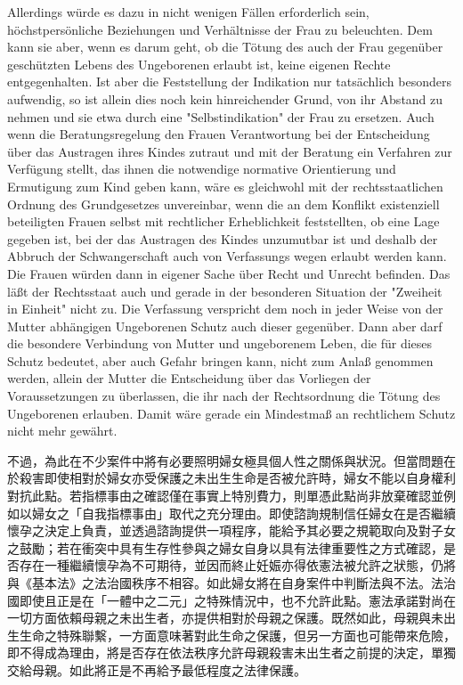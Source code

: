 \documentclass[12pt]{article}
\begin{document}
\begin{sourcepara}[title={原文D.95}]
Allerdings würde es dazu in nicht wenigen Fällen erforderlich sein, höchstpersönliche Beziehungen und Verhältnisse der Frau zu beleuchten. Dem kann sie aber, wenn es darum geht, ob die Tötung des auch der Frau gegenüber geschützten Lebens des Ungeborenen erlaubt ist, keine eigenen Rechte entgegenhalten. Ist aber die Feststellung der Indikation nur tatsächlich besonders aufwendig, so ist allein dies noch kein hinreichender Grund, von ihr Abstand zu nehmen und sie etwa durch eine "Selbstindikation" der Frau zu ersetzen. Auch wenn die Beratungsregelung den Frauen Verantwortung bei der Entscheidung über das Austragen ihres Kindes zutraut und mit der Beratung ein Verfahren zur Verfügung stellt, das ihnen die notwendige normative Orientierung und Ermutigung zum Kind geben kann, wäre es gleichwohl mit der rechtsstaatlichen Ordnung des Grundgesetzes unvereinbar, wenn die an dem Konflikt existenziell beteiligten Frauen selbst mit rechtlicher Erheblichkeit feststellten, ob eine Lage gegeben ist, bei der das Austragen des Kindes unzumutbar ist und deshalb der Abbruch der Schwangerschaft auch von Verfassungs wegen erlaubt werden kann. Die Frauen würden dann in eigener Sache über Recht und Unrecht befinden. Das läßt der Rechtsstaat auch und gerade in der besonderen Situation der "Zweiheit in Einheit" nicht zu. Die Verfassung verspricht dem noch in jeder Weise von der Mutter abhängigen Ungeborenen Schutz auch dieser gegenüber. Dann aber darf die besondere Verbindung von Mutter und ungeborenem Leben, die für dieses Schutz bedeutet, aber auch Gefahr bringen kann, nicht zum Anlaß genommen werden, allein der Mutter die Entscheidung über das Vorliegen der Voraussetzungen zu überlassen, die ihr nach der Rechtsordnung die Tötung des Ungeborenen erlauben. Damit wäre gerade ein Mindestmaß an rechtlichem Schutz nicht mehr gewährt.
\end{sourcepara}
\begin{transpara}
不過，為此在不少案件中將有必要照明婦女極具個人性之關係與狀況。但當問題在於殺害即使相對於婦女亦受保護之未出生生命是否被允許時，婦女不能以自身權利對抗此點。若指標事由之確認僅在事實上特別費力，則單憑此點尚非放棄確認並例如以婦女之「自我指標事由」取代之充分理由。即使諮詢規制信任婦女在是否繼續懷孕之決定上負責，並透過諮詢提供一項程序，能給予其必要之規範取向及對子女之鼓勵；若在衝突中具有生存性參與之婦女自身以具有法律重要性之方式確認，是否存在一種繼續懷孕為不可期待，並因而終止妊娠亦得依憲法被允許之狀態，仍將與《基本法》之法治國秩序不相容。如此婦女將在自身案件中判斷法與不法。法治國即使且正是在「一體中之二元」之特殊情況中，也不允許此點。憲法承諾對尚在一切方面依賴母親之未出生者，亦提供相對於母親之保護。既然如此，母親與未出生生命之特殊聯繫，一方面意味著對此生命之保護，但另一方面也可能帶來危險，即不得成為理由，將是否存在依法秩序允許母親殺害未出生者之前提的決定，單獨交給母親。如此將正是不再給予最低程度之法律保護。
\end{transpara}
\end{document}
